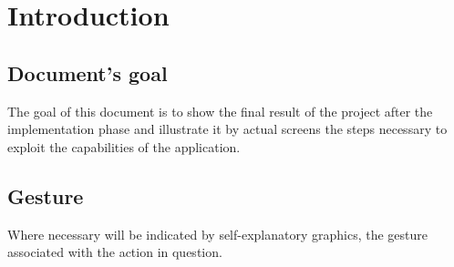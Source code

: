 


\chapter{Introduction}



	\section{Document's goal}	
	The goal of this document is to show the final result of the project after the implementation phase and illustrate it by actual screens the steps necessary to exploit the capabilities of the application.

	\section{Gesture}
	Where necessary will be indicated by self-explanatory graphics, the gesture associated with the action in question.